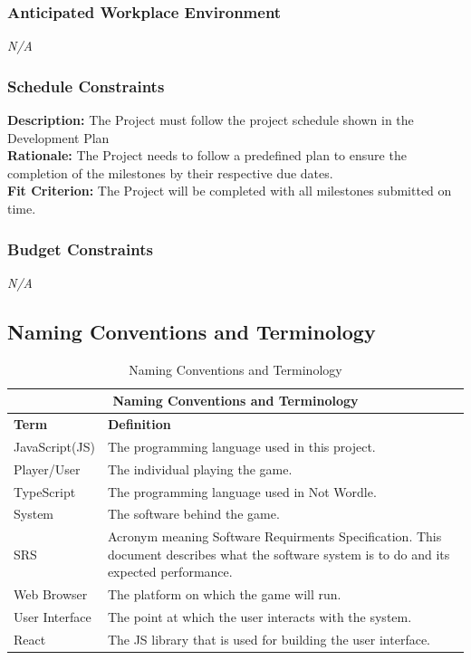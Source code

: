 \documentclass[12pt, titlepage]{article}
\begin{document}
	\subsubsection{Anticipated Workplace Environment}
	\noindent \emph{N/A}
	
	\subsubsection{Schedule Constraints}
	\noindent \textbf{Description:} The Project must follow the project 
	schedule shown in the Development Plan\\
	\textbf{Rationale:} The Project needs to follow a predefined plan 
	to ensure the completion of the milestones by their respective due dates. \\
	\textbf{Fit Criterion:} The Project will be completed with all milestones 
	submitted on time. 
	
	\subsubsection{Budget Constraints}
	\noindent \emph{N/A}
	
	\newpage
	\subsection{Naming Conventions and Terminology}
	\begin{table}[h!]
		\caption{Naming Conventions and Terminology}
		\begin{tabular}{ |p{6cm}|p{8cm}|  }
			\hline
			\multicolumn{2}{|c|}{Naming Conventions and Terminology} \\
			\hline
			\textbf{Term} & \textbf{Definition}\\
			\hline
			JavaScript(JS) & The programming language used in this project.  \\
			\hline
			Player/User & The individual playing the game.   \\
			\hline
			TypeScript & The programming language used in Not Wordle.  \\
			\hline
			System    & The software behind the game.  \\
			\hline 
			SRS & Acronym meaning Software Requirments Specification. This 
			document 
			describes what the software system is to do and its expected 
			performance.   \\
			\hline
			Web Browser & The platform on which the game will run. \\
			\hline
			User Interface & The point at which the user interacts with the 
			system.  \\
			\hline
			React & The JS library that is used for building the user 
			interface.  \\
			\hline
		\end{tabular}
	\end{table}
	
\end{document}

